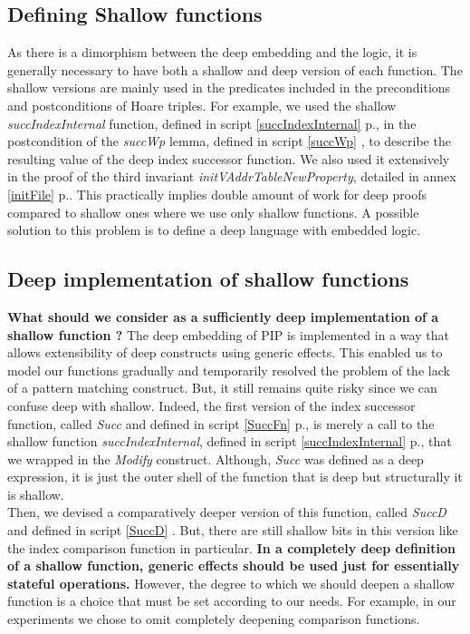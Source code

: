 \subsection{Defining Shallow functions}
As there is a dimorphism  between the deep embedding and the logic, it is generally necessary to have both a shallow and deep version of each function. The shallow versions are mainly used in the predicates included in the preconditions and postconditions of Hoare triples. For example, we used the shallow \textit{succIndexInternal} function, defined in script \ref{succIndexInternal} p.\pageref{succIndexInternal}, in the postcondition of the \textit{succWp} lemma, defined in script \ref{succWp} \pageref{succWp}, to describe the resulting value of the deep index successor function. We also used it extensively in the proof of the third invariant \textit{initVAddrTableNewProperty}, detailed in annex \ref{initFile} p.\pageref{initFile}. This practically implies double amount of work for deep proofs compared to shallow ones where we use only shallow functions. A possible solution to this problem is to define a deep language with embedded logic. 


\subsection{Deep implementation of shallow functions}
\textbf{What should we consider as a sufficiently deep implementation of a shallow function ?} The deep embedding of PIP is implemented in a way that allows extensibility of deep constructs using generic effects. This enabled us to model our functions gradually and temporarily resolved the problem of the lack of a pattern matching construct. But, it still remains quite risky since we can confuse deep with shallow. Indeed, the first version of the index successor function, called \textit{Succ} and defined in script \ref{SuccFn} p.\pageref{SuccFn}, is merely a call to the shallow function \textit{succIndexInternal}, defined in script \ref{succIndexInternal} p.\pageref{succIndexInternal}, that we wrapped in the \textit{Modify} construct. Although, \textit{Succ} was  defined as a deep expression, it is just the outer shell of the function that is deep but structurally it is shallow. \\

Then, we devised a comparatively deeper version of this function, called \textit{SuccD} and defined in script \ref{SuccD} \pageref{SuccD}. But, there are still shallow bits in this version like the index comparison function in particular. \textbf{In a completely deep definition of a shallow function, generic effects should be used just for essentially stateful operations.} However, the degree  to which we should deepen a shallow function is a choice that must be set according to our needs. For example, in our experiments we chose to omit completely deepening comparison functions.